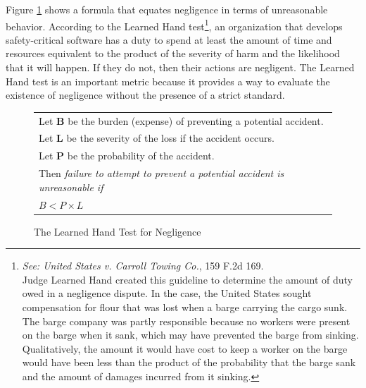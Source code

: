 \documentclass[12pt]{report}
\newenvironment{narrow}[2]{  
\begin{list}{}{  
  \setlength{\topsep}{0pt}  
  \setlength{\leftmargin}{#1}  
  \setlength{\rightmargin}{#2}  
  \setlength{\listparindent}{\parindent}  
  \setlength{\itemindent}{\parindent}  
  \setlength{\parsep}{\parskip}}  
\item[]}{\end{list}}
\begin{document}
Figure \ref{fig:handtest} shows a formula that equates negligence in terms of unreasonable behavior.  According to the Learned Hand test\footnote{\textit{See: United States v. Carroll Towing Co.}, 159 F.2d 169.\\ Judge Learned Hand created this guideline to determine the amount of duty owed in a negligence dispute. In the case, the United States sought compensation for flour that was lost when a barge carrying the cargo sunk. The barge company was partly responsible because no workers were present on the barge when it sank, which may have prevented the barge from sinking. Qualitatively, the amount it would have cost to keep a worker on the barge would have been less than the product of the probability that the barge sank and the amount of damages incurred from it sinking.}, an organization that develops safety-critical software has a duty to spend at least the amount of time and resources equivalent to the product of the severity of harm and the likelihood that it will happen. If they do not, then their actions are negligent. The Learned Hand test is an important metric because it provides a way to evaluate the existence of negligence without the presence of a strict standard. 

\begin{figure} 
\begin{narrow}{-1.5in}{-1.5in}\begin{center} 
\begin{tabular}{|l|} 
\hline 
	Let \textbf{B} be the burden (expense) of preventing a potential accident.\\ 
	Let \textbf{L} be the severity of the loss if the accident occurs.\\ 
	Let \textbf{P} be the probability of the accident.\\[6pt] 
	Then \textit{failure to attempt to prevent a potential accident is  
	unreasonable if}\\[8pt] 

     \centerline{\(B < P \times L\)} 
\\[3pt] 
\hline 
\end{tabular} 
\end{center}\end{narrow} 
\caption{The Learned Hand Test for Negligence} 
\label{fig:handtest} 
\end{figure} 
\end{document}
